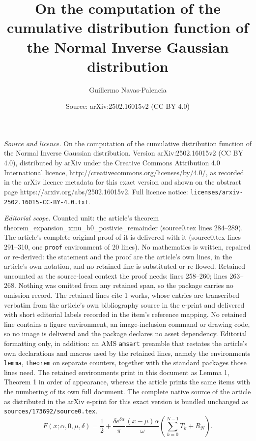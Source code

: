 \documentclass[10pt,a4paper]{amsart}
\title{On the computation of the cumulative distribution function of the Normal Inverse Gaussian distribution}
\author{Guillermo Navas-Palencia}
\date{Source: arXiv:2502.16015v2 (CC BY 4.0)}
\begin{document}
\maketitle

\noindent\emph{Source and licence.} On the computation of the cumulative distribution function of the Normal Inverse Gaussian distribution. Version arXiv:2502.16015v2 (CC BY 4.0), distributed by arXiv under the Creative Commons Attribution 4.0 International licence, http://creativecommons.org/licenses/by/4.0/, as recorded in the arXiv licence metadata for this exact version and shown on the abstract page https://arxiv.org/abs/2502.16015v2. Full licence notice: \texttt{licenses/arxiv-2502.16015-CC-BY-4.0.txt}.\par\smallskip

\noindent\textit{Editorial scope.} Counted unit: the article's theorem theorem\_expansion\_xmu\_b0\_postivie\_remainder (source0.tex lines 284--289). The article's complete original proof of it is delivered with it (source0.tex lines 291--310, one \texttt{proof} environment of 20 lines). No mathematics is written, repaired or re-derived: the statement and the proof are the article's own lines, in the article's own notation, and no retained line is substituted or re-flowed.  Retained uncounted as the source-local context the proof needs: lines 258--260; lines 263--268.  Nothing was omitted from any retained span, so the package carries no omission record.  The retained lines cite 1 works, whose entries are transcribed verbatim from the article's own bibliography source in the e-print and delivered with short editorial labels recorded in the item's reference mapping.  No retained line contains a figure environment, an image-inclusion command or drawing code, so no image is delivered and the package declares no asset dependency.  Editorial formatting only, in addition: an AMS \texttt{amsart} preamble that restates the article's own declarations and macros used by the retained lines, namely the environments \texttt{lemma}, \texttt{theorem} on separate counters, together with the standard packages those lines need.  The retained environments print in this document as Lemma 1, Theorem 1 in order of appearance, whereas the article prints the same items with the numbering of its own full document.  The complete native source of the article as distributed in the arXiv e-print for this exact version is bundled unchanged as \texttt{sources/173692/source0.tex}.
\begin{equation}\label{expansion_xmu_b0_positive_with_remainder}
F(x; \alpha, 0, \mu, \delta) = \frac{1}{2} + \frac{\delta e^{\delta \alpha}}{\pi}\frac{(x-\mu)\alpha}{\omega}\left(\sum_{k=0}^{N-1}T_k + R_N\right).
\end{equation}
\end{document}
